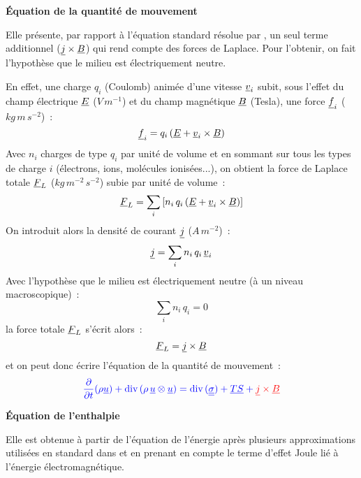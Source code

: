 \vspace*{0,5cm}
{\bf \'Equation de la quantit\'e de mouvement}
\nopagebreak

Elle pr\'esente, par rapport \`a
l'\'equation standard r\'esolue par \CS, un seul terme additionnel
($\underline{j} \times \underline{B}$) qui rend compte des forces de Laplace.
Pour l'obtenir, on fait l'hypoth\`ese que le milieu est
\'electriquement neutre.

En effet, une charge $q_i$ (Coulomb) anim\'ee d'une
vitesse $\underline{v}_i$ subit,
sous l'effet du champ \'electrique $\underline{E}$ ($V\,m^{-1}$) et du champ magn\'etique
$\underline{B}$ (Tesla),  une force $\underline{f}_i$ ($kg\,m\,s^{-2}$)~:
\begin{equation}
\underline{f}_i=q_i\left(\underline{E} + \underline{v}_i \times \underline{B}\right)
\end{equation}
Avec $n_i$ charges de type $q_i$ par unit\'e de volume et en sommant sur tous
les types de charge $i$ (\'electrons, ions, mol\'ecules ionis\'ees...), on
obtient la force de Laplace totale $\underline{F}_L$ ($kg\,m^{-2}\,s^{-2}$) subie par unit\'e de
volume~:
\begin{equation}
\underline{F}_L=\sum\limits_i\left[{n_i\,q_i\left(\underline{E} + \underline{v}_i \times \underline{B}\right)}\right]
\end{equation}
On introduit alors la densit\'e de courant $\underline{j}$ ($A\,m^{-2}$)~:
\begin{equation}
\underline{j}=\sum\limits_i n_i\,q_i\,\underline{v}_i
\end{equation}
Avec l'hypoth\`ese que le milieu est \'electriquement neutre (\`a un
niveau macroscopique)~:
\begin{equation}
\sum\limits_i n_i\,q_i = 0
\end{equation}
la force totale $\underline{F}_L$ s'\'ecrit alors~:
\begin{equation}
\underline{F}_L=\underline{j} \times \underline{B}
\end{equation}
et on peut donc \'ecrire l'\'equation de la quantit\'e de mouvement~:
\begin{equation}
\displaystyle{\color{blue}\frac{\partial}{\partial t}(\rho \underline{u})
+\text{div}\,(\rho\, \underline{u} \otimes \underline{u})
=\text{div}\,(\underline{\underline{\sigma}}) + \underline{TS} + {\color{red}\underline{j} \times \underline{B}}}
\end{equation}

\vspace*{0,5cm}
{\bf \'Equation de l'enthalpie}
\nopagebreak

Elle est obtenue \`a partir de l'équation de
l'\'energie apr\`es plusieurs approximations utilis\'ees en standard dans \CS et en
prenant en compte le terme d'effet Joule li\'e \`a l'\'energie
\'electromagn\'etique.

